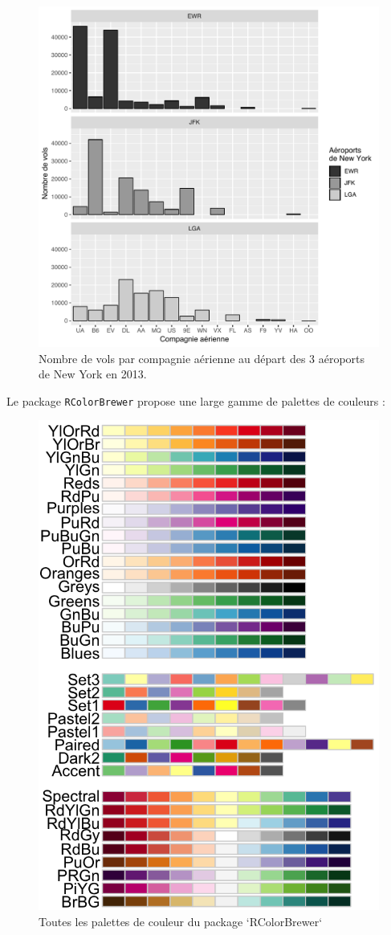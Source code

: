 \documentclass[a4paperpaper,]{article}
\theoremstyle{definition}
\theoremstyle{definition}
\theoremstyle{definition}
\theoremstyle{remark}
\begin{document}
\begin{figure}[htpb]

{\centering \includegraphics[width=0.9\linewidth]{figure/barfacetgray-1} 

}

\caption{Nombre de vols par compagnie aérienne au départ des 3 aéroports de New York en 2013.}\label{fig:barfacetgray}
\end{figure}

Le package \texttt{RColorBrewer} propose une large gamme de palettes de
couleurs :

\begin{figure}[htpb]

{\centering \includegraphics[width=0.5\linewidth]{images/brewer} 

}

\caption{Toutes les palettes de couleur du package `RColorBrewer`}\label{fig:RcolorbrewerPalettes}
\end{figure}
\end{document}
